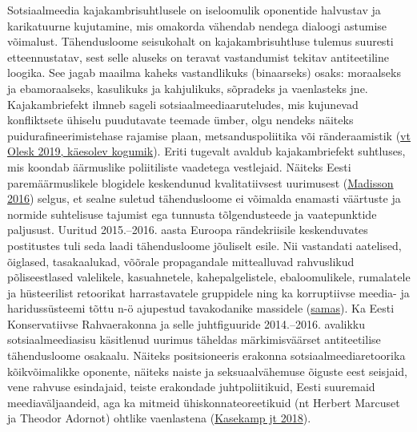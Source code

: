 \documentclass[estonian,]{article}
\begin{document}
Sotsiaalmeedia kajakambrisuhtlusele on iseloomulik oponentide halvustav ja karikatuurne kujutamine, mis omakorda vähendab nendega dialoogi astumise võimalust. Tähendusloome seisukohalt on kajakambrisuhtluse tulemus suuresti etteennustatav, sest selle aluseks on teravat vastandumist tekitav antiteetiline loogika. See jagab maailma kaheks vastandlikuks (binaarseks) osaks: moraalseks ja ebamoraalseks, kasulikuks ja kahjulikuks, sõpradeks ja vaenlasteks jne. Kajakambriefekt ilmneb sageli sotsiaalmeediaaruteludes, mis kujunevad konfliktsete ühiselu puudutavate teemade ümber, olgu nendeks näiteks puidurafineerimistehase rajamise plaan, metsanduspoliitika või ränderaamistik (\protect\hyperlink{chapter43}{vt Olesk 2019, käesolev kogumik}). Eriti tugevalt avaldub kajakambriefekt suhtluses, mis koondab äärmuslike poliitiliste vaadetega vestlejaid. Näiteks Eesti paremäärmuslikele blogidele keskendunud kvalitatiivsest uurimusest (\protect\hyperlink{Madisson2016}{Madisson 2016}) selgus, et sealne suletud tähendusloome ei võimalda enamasti väärtuste ja normide suhtelisuse tajumist ega tunnusta tõlgendusteede ja vaatepunktide paljusust. Uuritud 2015.--2016. aasta Euroopa rändekriisile keskenduvates postitustes tuli seda laadi tähendusloome jõuliselt esile. Nii vastandati aatelised, õiglased, tasakaalukad, võõrale propagandale mittealluvad rahvuslikud põliseestlased valelikele, kasuahnetele, kahepalgelistele, ebaloomulikele, rumalatele ja hüsteerilist retoorikat harrastavatele gruppidele ning ka korruptiivse meedia- ja haridussüsteemi tõttu n-ö ajupestud tavakodanike massidele (\protect\hyperlink{Madisson2016}{samas}). Ka Eesti Konservatiivse Rahvaerakonna ja selle juhtfiguuride 2014.--2016. avalikku sotsiaalmeediasisu käsitlenud uurimus täheldas märkimisväärset antiteetilise tähendusloome osakaalu. Näiteks positsioneeris erakonna sotsiaalmeediaretoorika kõikvõimalikke oponente, näiteks naiste ja seksuaalvähemuse õiguste eest seisjaid, vene rahvuse esindajaid, teiste erakondade juhtpoliitikuid, Eesti suuremaid meediaväljaandeid, aga ka mitmeid ühiskonnateoreetikuid (nt Herbert Marcuset ja Theodor Adornot) ohtlike vaenlastena (\protect\hyperlink{Kasekamp2018}{Kasekamp jt 2018}).
\end{document}
